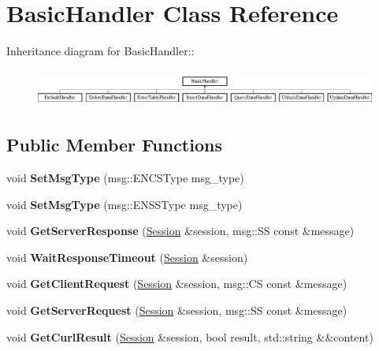 \hypertarget{classBasicHandler}{
\section{BasicHandler Class Reference}
\label{classBasicHandler}
}
Inheritance diagram for BasicHandler::\begin{figure}[H]
\begin{center}
\leavevmode
\includegraphics[height=1.23077cm]{classBasicHandler}
\end{center}
\end{figure}
\subsection*{Public Member Functions}
\begin{DoxyCompactItemize}
\item 
\hypertarget{classBasicHandler_a5d33fd5fae39d5c87efb219d6d5074cf}{
void {\bfseries SetMsgType} (msg::ENCSType msg\_\-type)}
\label{classBasicHandler_a5d33fd5fae39d5c87efb219d6d5074cf}

\item 
\hypertarget{classBasicHandler_a47bb7a7bd9639ac14c91546009e5d9b0}{
void {\bfseries SetMsgType} (msg::ENSSType msg\_\-type)}
\label{classBasicHandler_a47bb7a7bd9639ac14c91546009e5d9b0}

\item 
\hypertarget{classBasicHandler_a1a6fa5d4bc3477ab2ef772073e7c7bf7}{
void {\bfseries GetServerResponse} (\hyperlink{classSession}{Session} \&session, msg::SS const \&message)}
\label{classBasicHandler_a1a6fa5d4bc3477ab2ef772073e7c7bf7}

\item 
\hypertarget{classBasicHandler_a71c464a8f12dbe96e1f28c095d96f0a3}{
void {\bfseries WaitResponseTimeout} (\hyperlink{classSession}{Session} \&session)}
\label{classBasicHandler_a71c464a8f12dbe96e1f28c095d96f0a3}

\item 
\hypertarget{classBasicHandler_a26ba43df72cbf12829913219d77d58b0}{
void {\bfseries GetClientRequest} (\hyperlink{classSession}{Session} \&session, msg::CS const \&message)}
\label{classBasicHandler_a26ba43df72cbf12829913219d77d58b0}

\item 
\hypertarget{classBasicHandler_a98a430506bb021856f670c5a95ce4dd3}{
void {\bfseries GetServerRequest} (\hyperlink{classSession}{Session} \&session, msg::SS const \&message)}
\label{classBasicHandler_a98a430506bb021856f670c5a95ce4dd3}

\item 
\hypertarget{classBasicHandler_ab7694475f143f46e66bf03a156efaeb1}{
void {\bfseries GetCurlResult} (\hyperlink{classSession}{Session} \&session, bool result, std::string \&\&content)}
\label{classBasicHandler_ab7694475f143f46e66bf03a156efaeb1}

\end{DoxyCompactItemize}
